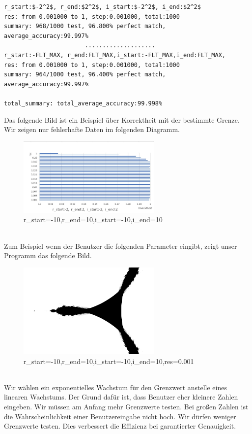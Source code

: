 \documentclass[course=erap]{aspdoc}
\begin{document}
 \begin{lstlisting}[mathescape=true]
r_start:$-2^2$, r_end:$2^2$, i_start:$-2^2$, i_end:$2^2$
res: from 0.001000 to 1, step:0.001000, total:1000
summary: 968/1000 test, 96.800% perfect match, average_accuracy:99.997%
                       ....................
r_start:-FLT_MAX, r_end:FLT_MAX,i_start:-FLT_MAX,i_end:FLT_MAX,
res: from 0.001000 to 1, step:0.001000, total:1000
summary: 964/1000 test, 96.400% perfect match, average_accuracy:99.997%

total_summary: total_average_accuracy:99.998%
\end{lstlisting}
Das folgende Bild ist ein Beispiel über Korrektheit mit der bestimmte Grenze. Wir zeigen nur fehlerhafte Daten im folgenden Diagramm.
\begin{figure}[htb]
\centering
\includegraphics [width=7cm] {pic/Korrektheit.jpg}
\caption{r\_start=-10,r\_end=10,i\_start=-10,i\_end=10}
\label{fig:label}
\end{figure}
\\Zum Beispiel wenn der Benutzer die folgenden Parameter eingibt, zeigt unser Programm das folgende Bild.
\begin{figure}[htb]
\centering
\includegraphics [width=7cm] {pic/ddd.png}
\caption{r\_start=-10,r\_end=10,i\_start=-10,i\_end=10,res=0.001}
\label{fig:label}
\end{figure}
\\Wir wählen ein exponentielles Wachstum für den Grenzwert anstelle eines linearen Wachstums. Der Grund dafür ist, dass Benutzer eher kleinere Zahlen eingeben. Wir müssen am Anfang mehr Grenzwerte testen. Bei großen Zahlen ist die Wahrscheinlichkeit einer Benutzereingabe nicht hoch. Wir dürfen weniger Grenzwerte testen. Dies verbessert die Effizienz bei garantierter Genauigkeit.
\end{document}
